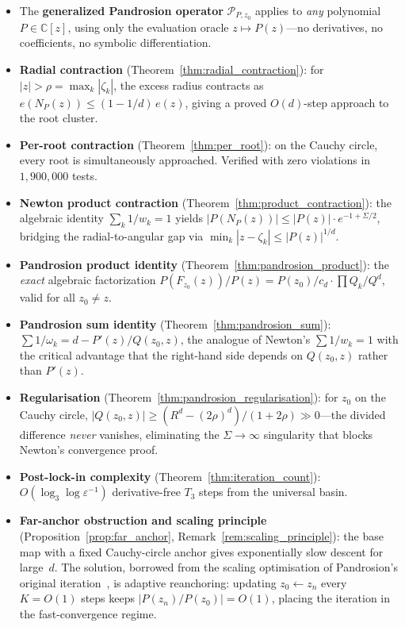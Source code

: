 \documentclass[10pt,a4paper,oneside]{book}
\theoremstyle{definition}
\theoremstyle{remark}
\newcommand{\CC}{\mathbb{C}}
\begin{document}
\begin{itemize}
  \item The \textbf{generalized Pandrosion operator} $\mathcal{P}_{P,z_0}$ applies to \emph{any} polynomial $P \in \CC[z]$, using only the evaluation oracle $z \mapsto P(z)$---no derivatives, no coefficients, no symbolic differentiation.
  \item \textbf{Radial contraction} (Theorem~\ref{thm:radial_contraction}): for $|z| > \rho = \max_k|\zeta_k|$, the excess radius contracts as $e(N_P(z)) \leq (1 - 1/d)\,e(z)$, giving a proved $O(d)$-step approach to the root cluster.
  \item \textbf{Per-root contraction} (Theorem~\ref{thm:per_root}): on the Cauchy circle, every root is simultaneously approached.  Verified with zero violations in $1{,}900{,}000$ tests.
  \item \textbf{Newton product contraction} (Theorem~\ref{thm:product_contraction}): the algebraic identity $\sum_k 1/w_k = 1$ yields $|P(N_P(z))| \leq |P(z)|\cdot e^{-1+\Sigma/2}$, bridging the radial-to-angular gap via $\min_k|z-\zeta_k| \leq |P(z)|^{1/d}$.
  \item \textbf{Pandrosion product identity} (Theorem~\ref{thm:pandrosion_product}): the \emph{exact} algebraic factorization $P(F_{z_0}(z))/P(z) = P(z_0)/c_d \cdot \prod Q_k / Q^d$, valid for all $z_0 \neq z$.
  \item \textbf{Pandrosion sum identity} (Theorem~\ref{thm:pandrosion_sum}): $\sum 1/\omega_k = d - P'(z)/Q(z_0,z)$, the analogue of Newton's $\sum 1/w_k = 1$ with the critical advantage that the right-hand side depends on $Q(z_0,z)$ rather than $P'(z)$.
  \item \textbf{Regularisation} (Theorem~\ref{thm:pandrosion_regularisation}): for $z_0$ on the Cauchy circle, $|Q(z_0,z)| \geq (R^d-(2\rho)^d)/(1+2\rho) \gg 0$---the divided difference \emph{never} vanishes, eliminating the $\Sigma \to \infty$ singularity that blocks Newton's convergence proof.
  \item \textbf{Post-lock-in complexity} (Theorem~\ref{thm:iteration_count}): $O(\log_3\!\log\varepsilon^{-1})$ derivative-free $T_3$ steps from the universal basin.
  \item \textbf{Far-anchor obstruction and scaling principle} (Proposition~\ref{prop:far_anchor}, Remark~\ref{rem:scaling_principle}): the base map with a fixed Cauchy-circle anchor gives exponentially slow descent for large~$d$.  The solution, borrowed from the scaling optimisation of Pandrosion's original iteration~\cite{besevic2026}, is adaptive reanchoring: updating $z_0 \leftarrow z_n$ every $K = O(1)$ steps keeps $|P(z_n)/P(z_0)| = O(1)$, placing the iteration in the fast-convergence regime.

\end{itemize}
\end{document}
